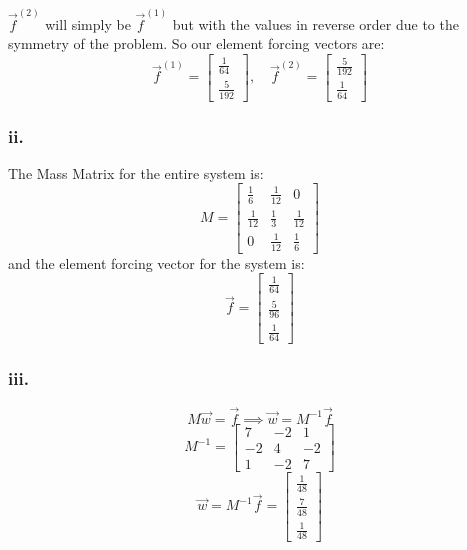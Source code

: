 \documentclass{article}
\begin{document}
$\vec f^{(2)}$ will simply be $\vec f^{(1)}$ but with the values in reverse order due to the symmetry of the problem. So our element forcing vectors are:
\begin{equation}
\boxed{
\vec f^{(1)}=
\begin{bmatrix}
\frac{1}{64} \\[1ex] \frac{5}{192}
\end{bmatrix},
\quad 
\vec f^{(2)}=
\begin{bmatrix}
\frac{5}{192} \\[1ex] \frac{1}{64}
\end{bmatrix}
}
\end{equation}

\subsubsection*{ii.}
The Mass Matrix for the entire system is:
\begin{equation}
\boxed{
M=
\begin{bmatrix}
\frac{1}{6} & \frac{1}{12} & 0 \\[1ex]
\frac{1}{12} & \frac{1}{3} & \frac{1}{12} \\[1ex]
0 & \frac{1}{12} & \frac{1}{6}
\end{bmatrix}
}
\end{equation}
and the element forcing vector for the system is:
\begin{equation}
\boxed{
\vec f =
\begin{bmatrix}
\frac{1}{64} \\[1ex] \frac{5}{96} \\[1ex] \frac{1}{64}
\end{bmatrix}
}
\end{equation}

\subsubsection*{iii.}
\begin{equation}
M\vec w=\vec f \implies \vec w = M^{-1} \vec f
\end{equation}
\begin{equation}
M^{-1} = 
\begin{bmatrix}
7 & -2 & 1 \\
-2 & 4 & -2 \\
1 & -2 & 7
\end{bmatrix}
\end{equation}
\begin{equation}
\vec w =M^{-1}\vec f=
\boxed{
\begin{bmatrix}
\frac{1}{48} \\[1ex] \frac{7}{48} \\[1ex] \frac{1}{48}
\end{bmatrix}
}
\end{equation}
\end{document}
